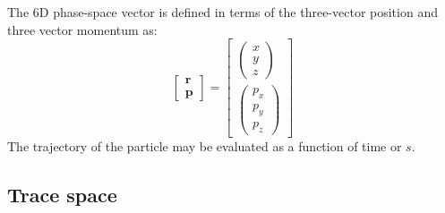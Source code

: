 The 6D phase-space vector is defined in terms of the three-vector
position and three vector momentum as:
\begin{equation}
  \begin{bmatrix} \bm{r} \\ \bm{p} \end{bmatrix} = 
  \begin{bmatrix} \begin{pmatrix} x   \\   y \\ z   \end{pmatrix} \\
                  \begin{pmatrix} p_x \\ p_y \\ p_z \end{pmatrix} \end{bmatrix}
\end{equation}
The trajectory of the particle may be evaluated as a function of time
or $s$.

\subsection{Trace space}

